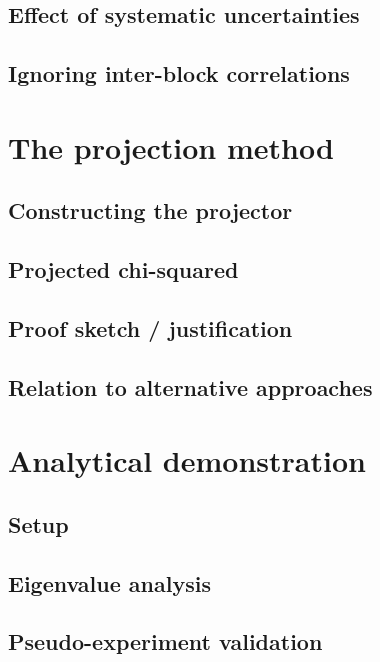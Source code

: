 \documentclass[aps,prd,twocolumn,showpacs,superscriptaddress,floatfix]{revtex4-2}
\begin{document}
\subsection{Effect of systematic uncertainties}

\subsection{Ignoring inter-block correlations}

\section{The projection method}

\subsection{Constructing the projector}

\subsection{Projected chi-squared}

\subsection{Proof sketch / justification}

\subsection{Relation to alternative approaches}

\section{Analytical demonstration}

\subsection{Setup}

\subsection{Eigenvalue analysis}

\subsection{Pseudo-experiment validation}
\end{document}
